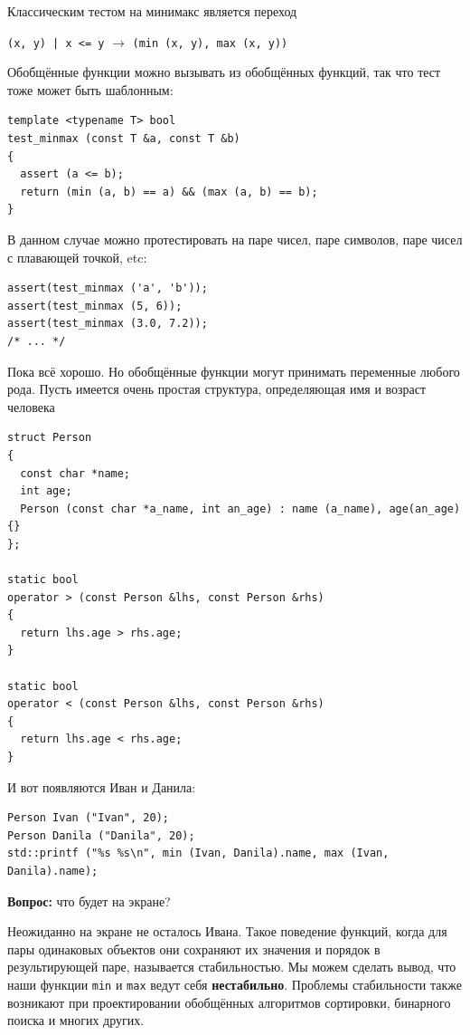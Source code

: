 \documentclass[a4paper,12pt,oneside]{article}
\begin{document}
Классическим тестом на минимакс является переход 

\lstinline!(x, y) | x <= y! $\rightarrow$ \lstinline!(min (x, y), max (x, y))!

Обобщённые функции можно вызывать из обобщённых функций, так что тест тоже может быть шаблонным:

\begin{lstlisting}
template <typename T> bool
test_minmax (const T &a, const T &b)
{
  assert (a <= b);
  return (min (a, b) == a) && (max (a, b) == b);
}

\end{lstlisting}

В данном случае можно протестировать на паре чисел, паре символов, паре чисел с плавающей точкой, etc:

\begin{lstlisting}
assert(test_minmax ('a', 'b'));
assert(test_minmax (5, 6));
assert(test_minmax (3.0, 7.2));
/* ... */
\end{lstlisting}

Пока всё хорошо. Но обобщённые функции могут принимать переменные любого рода. Пусть имеется очень простая структура, определяющая имя и возраст человека

\begin{lstlisting}
struct Person
{
  const char *name;
  int age;
  Person (const char *a_name, int an_age) : name (a_name), age(an_age) {}
};

static bool
operator > (const Person &lhs, const Person &rhs)
{
  return lhs.age > rhs.age;
}

static bool
operator < (const Person &lhs, const Person &rhs)
{
  return lhs.age < rhs.age;
}
\end{lstlisting}

И вот появляются Иван и Данила:

\begin{lstlisting}
Person Ivan ("Ivan", 20);
Person Danila ("Danila", 20);
std::printf ("%s %s\n", min (Ivan, Danila).name, max (Ivan, Danila).name);
\end{lstlisting}

\textbf{Вопрос:} что будет на экране?

Неожиданно на экране не осталось Ивана. Такое поведение функций, когда для пары одинаковых объектов они сохраняют их значения и порядок в результирующей паре, называется стабильностью. Мы можем сделать вывод, что наши функции \lstinline!min! и \lstinline!max! ведут себя \textbf{нестабильно}. Проблемы стабильности также возникают при проектировании обобщённых алгоритмов сортировки, бинарного поиска и многих других.
\end{document}
